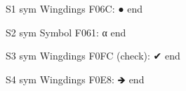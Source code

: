 \documentclass[11pt,a4paper]{article}
\begin{document}
S1 sym Wingdings F06C: ● end

S2 sym Symbol F061: α end

S3 sym Wingdings F0FC (check): ✔ end

S4 sym Wingdings F0E8: 🡺 end
\end{document}
